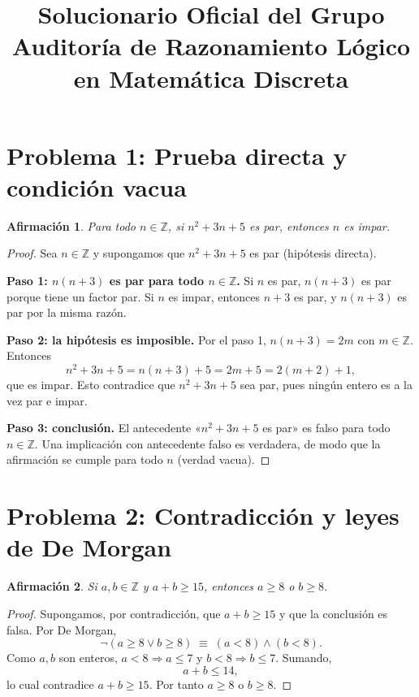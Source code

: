 \documentclass[11pt]{article}
\title{Solucionario Oficial del Grupo\\[2pt]\large Auditoría de Razonamiento Lógico en Matemática Discreta}
\date{}
\newtheorem*{afirmacion}{Afirmación}
\newcommand{\Z}{\mathbb{Z}}
\begin{document}
\maketitle

\section*{Problema 1: Prueba directa y condición vacua}

\begin{afirmacion}
Para todo $n\in\Z$, si $n^2+3n+5$ es par, entonces $n$ es impar.
\end{afirmacion}

\begin{proof}
Sea $n\in\Z$ y supongamos que $n^2+3n+5$ es par (hipótesis directa).

\textbf{Paso 1: $n(n+3)$ es par para todo $n\in\Z$.}
Si $n$ es par, $n(n+3)$ es par porque tiene un factor par.
Si $n$ es impar, entonces $n+3$ es par, y $n(n+3)$ es par por la misma razón.

\textbf{Paso 2: la hipótesis es imposible.}
Por el paso 1, $n(n+3)=2m$ con $m\in\Z$. Entonces
\[
n^2+3n+5 = n(n+3)+5 = 2m+5 = 2(m+2)+1,
\]
que es impar. Esto contradice que $n^2+3n+5$ sea par, pues ningún entero es a la vez par e impar.

\textbf{Paso 3: conclusión.}
El antecedente «$n^2+3n+5$ es par» es falso para todo $n\in\Z$. Una implicación con antecedente falso es verdadera, de modo que la afirmación se cumple para todo $n$ (verdad vacua).
\end{proof}

\section*{Problema 2: Contradicción y leyes de De Morgan}

\begin{afirmacion}
Si $a,b\in\Z$ y $a+b\ge 15$, entonces $a\ge 8$ o $b\ge 8$.
\end{afirmacion}

\begin{proof}
Supongamos, por contradicción, que $a+b\ge 15$ y que la conclusión es falsa. Por De Morgan,
\[
\neg(a\ge 8 \lor b\ge 8)\;\equiv\;(a<8)\land(b<8).
\]
Como $a,b$ son enteros, $a<8\Rightarrow a\le 7$ y $b<8\Rightarrow b\le 7$. Sumando,
\[
a+b\le 14,
\]
lo cual contradice $a+b\ge 15$. Por tanto $a\ge 8$ o $b\ge 8$.
\end{proof}
\end{document}
